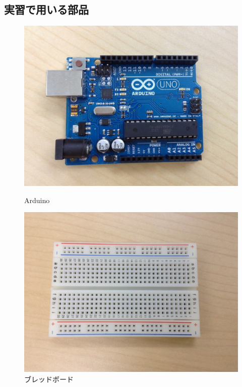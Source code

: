 \documentclass[11pt,a4paper]{jarticle}
\begin{document}
\subsection*{実習で用いる部品}
\begin{figure}[h!]
 \begin{minipage}{0.5\columnwidth}
  \centering
  \includegraphics[height=0.4\columnwidth]{img/arduino.eps}
  \caption{Arduino}
 \end{minipage}
 \begin{minipage}{0.5\columnwidth}
  \centering
  \includegraphics[height=0.4\columnwidth]{img/breadboard.eps}
  \caption{ブレッドボード}
 \end{minipage}
\end{figure}
\end{document}
